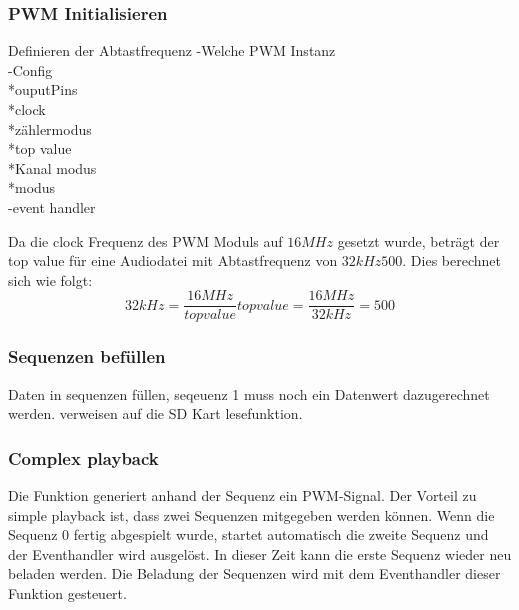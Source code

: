 \subsubsection*{PWM Initialisieren}\label{sec:PWM initialisieren}
Definieren der Abtastfrequenz
-Welche PWM Instanz\\
-Config\\
	*ouputPins\\
	*clock\\
	*zählermodus\\
	*top value\\
	*Kanal modus\\
	*modus\\
-event handler

Da die clock Frequenz des PWM Moduls auf $16MHz$ gesetzt wurde, beträgt der top value für eine Audiodatei mit Abtastfrequenz von $32kHz 500$. Dies berechnet sich wie folgt:
\begin{equation}
32kHz = \frac{16MHz}{top value}
top value = \frac{16MHz}{32kHz} = 500
\end{equation}

\subsubsection*{Sequenzen befüllen}\label{sec:Sequenzen befüllen}
Daten in sequenzen füllen, seqeuenz 1 muss noch ein Datenwert dazugerechnet werden. verweisen auf die SD Kart lesefunktion.

\subsubsection*{Complex playback}\label{sec:Complex playback}
Die Funktion generiert anhand der Sequenz ein PWM-Signal. Der
Vorteil zu simple playback ist, dass zwei Sequenzen mitgegeben werden können. Wenn die Sequenz 0 fertig abgespielt wurde, startet automatisch die zweite Sequenz und der Eventhandler wird ausgelöst. In dieser Zeit kann die erste Sequenz wieder neu beladen werden. Die Beladung der Sequenzen wird mit dem Eventhandler dieser Funktion gesteuert. 

